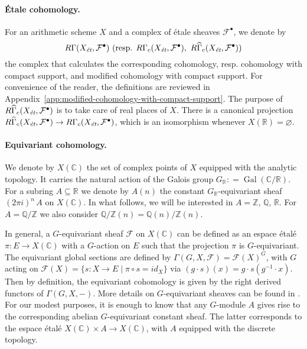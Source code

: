 \documentclass{article}
\DeclareMathOperator{\Gal}{Gal}
\newcommand{\CC}{\mathbb{C}}
\newcommand{\QQ}{\mathbb{Q}}
\newcommand{\RR}{\mathbb{R}}
\newcommand{\ZZ}{\mathbb{Z}}
\renewcommand{\emptyset}{\varnothing}
\newcommand{\et}{\text{\it ét}}
\newcommand{\dfn}{\mathrel{\mathop:}=}
\theoremstyle{definition}
\numberwithin{equation}{section}
\begin{document}
\paragraph{Étale cohomology.}
For an arithmetic scheme $X$ and a complex of étale sheaves
$\mathcal{F}^\bullet$, we denote by
\[ R\Gamma (X_\et, \mathcal{F}^\bullet) ~
\text{(resp. }R\Gamma_c (X_\et, \mathcal{F}^\bullet), ~
R\widehat{\Gamma}_c (X_\et, \mathcal{F}^\bullet)\text{)} \]
the complex that calculates the corresponding cohomology, resp. cohomology with
compact support, and modified cohomology with compact support. For convenience
of the reader, the definitions are reviewed in
Appendix~\ref{app:modified-cohomology-with-compact-support}. The purpose of
$R\widehat{\Gamma}_c (X_\et, \mathcal{F}^\bullet)$ is to take care of real
places of $X$. There is a canonical projection
$R\widehat{\Gamma}_c (X_\et, \mathcal{F}^\bullet) \to R\Gamma_c (X_\et, \mathcal{F}^\bullet)$,
which is an isomorphism whenever $X (\RR) = \emptyset$.

\paragraph{Equivariant cohomology.}
We denote by $X (\CC)$ the set of complex points of $X$ equipped with the
analytic topology. It carries the natural action of the Galois group
$G_\RR \dfn \Gal (\CC/\RR)$. For a subring $A \subseteq \RR$ we denote by
$A (n)$ the constant $G_\RR$-equivariant sheaf $(2\pi i)^n \, A$ on
$X (\CC)$. In what follows, we will be interested in $A = \ZZ$, $\QQ$, $\RR$.
For $A = \QQ/\ZZ$ we also consider $\QQ/\ZZ (n) = \QQ (n)/\ZZ (n)$.

In general, a $G$-equivariant sheaf $\mathcal{F}$ on $X (\CC)$ can be defined as
an espace étalé $\pi\colon E\to X (\CC)$ with a $G$-action on $E$ such that the
projection $\pi$ is $G$-equivariant. The equivariant global sections are defined
by $\Gamma (G,X,\mathcal{F}) = \mathcal{F} (X)^G$, with $G$ acting on
$\mathcal{F} (X) = \{ s\colon X\to E \mid \pi\circ s = id_X \}$ via
$(g\cdot s) (x) = g\cdot s (g^{-1}\cdot x)$. Then by definition, the equivariant
cohomology is given by the right derived functors of $\Gamma (G,X,-)$. More
details on $G$-equivariant sheaves can be found in
\cite[Chapitre~2]{Morin-these}. For our modest purposes, it is enough to know
that any $G$-module $A$ gives rise to the corresponding abelian $G$-equivariant
constant sheaf. The latter corresponds to the espace étalé
$X (\CC)\times A \to X (\CC)$, with $A$ equipped with the discrete topology.
\end{document}
